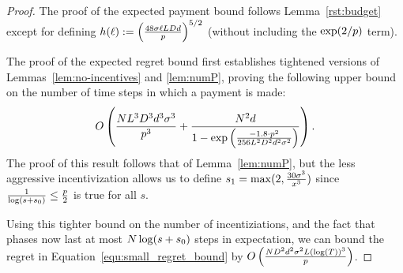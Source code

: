 \begin{proof}
  The proof of the expected payment bound follows Lemma~\ref{rst:budget} except for defining
  $h(\ell) := \left( \frac{48 \sigma \ell L D d}{p} \right)^{5/2}$
(without including the $\exp(2/p)$ term).

The proof of the expected regret bound first establishes tightened versions of Lemmas~\ref{lem:no-incentives} and \ref{lem:numP},
proving the following upper bound on the number of time steps in which a payment is made:
\begin{align}
O\left(\frac{N L^3 D^3 d^3 \sigma^3}{p^3}
  + \frac{N^2 d}{1 - \exp \left(
    \frac{-1.8 \cdot p^2}{256 L^2 D^2 d^2 \sigma^2}
  \right)} \right). \nonumber 
\end{align}
The proof of this result follows that of Lemma~\ref{lem:numP},
but the less aggressive incentivization allows us to define $s_1 = \max(2, \frac{30 \sigma^3}{x^3})$ since $\frac{1}{\log(s+s_0)} \leq \frac{p}{2}$ is true for all $s$.

Using this tighter bound on the number of incentiziations, and the fact that phases now last at most $N \log(s+s_0)$ steps in expectation, we can bound the regret in Equation~\ref{equ:small_regret_bound} by
$O\left(\frac{ND^2 d^2\sigma^2 L(\log(T))^3}{p}\right)$.
\end{proof}
